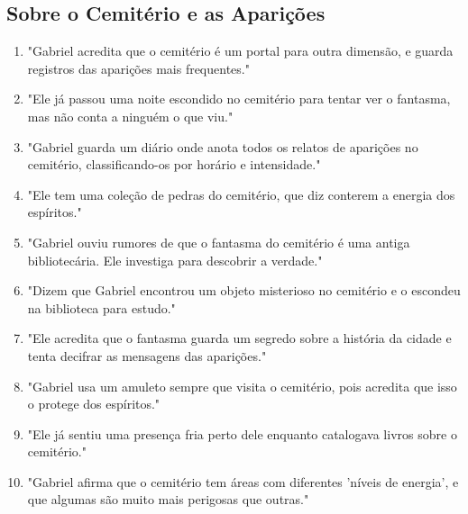 \subsection*{Sobre o Cemitério e as Aparições}
\begin{enumerate}
    \item "Gabriel acredita que o cemitério é um portal para outra dimensão, e guarda registros das aparições mais frequentes."
    \item "Ele já passou uma noite escondido no cemitério para tentar ver o fantasma, mas não conta a ninguém o que viu."
    \item "Gabriel guarda um diário onde anota todos os relatos de aparições no cemitério, classificando-os por horário e intensidade."
    \item "Ele tem uma coleção de pedras do cemitério, que diz conterem a energia dos espíritos."
    \item "Gabriel ouviu rumores de que o fantasma do cemitério é uma antiga bibliotecária. Ele investiga para descobrir a verdade."
    \item "Dizem que Gabriel encontrou um objeto misterioso no cemitério e o escondeu na biblioteca para estudo."
    \item "Ele acredita que o fantasma guarda um segredo sobre a história da cidade e tenta decifrar as mensagens das aparições."
    \item "Gabriel usa um amuleto sempre que visita o cemitério, pois acredita que isso o protege dos espíritos."
    \item "Ele já sentiu uma presença fria perto dele enquanto catalogava livros sobre o cemitério."
    \item "Gabriel afirma que o cemitério tem áreas com diferentes 'níveis de energia', e que algumas são muito mais perigosas que outras."
\end{enumerate}

